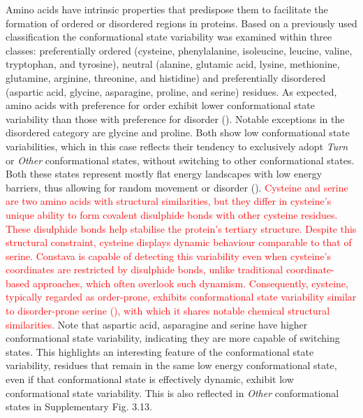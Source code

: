 Amino acids have intrinsic properties that predispose them to facilitate the formation of ordered or disordered regions in proteins. Based on a previously used classification \cite{cilia_protein_2013} the conformational state variability was examined within three classes: preferentially ordered (cysteine, phenylalanine, isoleucine, leucine, valine, tryptophan, and tyrosine), neutral (alanine, glutamic acid, lysine, methionine, glutamine, arginine, threonine, and histidine) and preferentially disordered (aspartic acid, glycine,  asparagine, proline, and serine) residues. As expected, amino acids with preference for order exhibit lower conformational state variability than those with preference for disorder (). Notable exceptions in the disordered category are glycine and proline. Both show low conformational state variabilities, which in this case reflects their tendency to exclusively adopt \textit{Turn} or \textit{Other} conformational states, without switching to other conformational states. Both these states represent mostly flat energy landscapes with low energy barriers, thus allowing for random movement or disorder (). 
\textcolor{red}{Cysteine and serine are two amino acids with structural similarities, but they differ in cysteine’s unique ability to form covalent disulphide bonds with other cysteine residues. These disulphide bonds help stabilise the protein’s tertiary structure. Despite this structural constraint, cysteine displays dynamic behaviour comparable to that of serine. Constava is capable of detecting this variability even when cysteine’s coordinates are restricted by disulphide bonds, unlike traditional coordinate-based approaches, which often overlook such dynamism. Consequently, cysteine, typically regarded as order-prone, exhibits conformational state variability similar to disorder-prone serine (), with which it shares notable chemical structural similarities.}
Note that aspartic acid, asparagine and serine have higher conformational state variability, indicating they are more capable of switching states. This highlights an interesting feature of the conformational state variability, residues that remain in the same low energy conformational state, even if that conformational state is effectively dynamic, exhibit low conformational state variability. This is also reflected in \textit{Other} conformational states in Supplementary Fig. 3.13.

